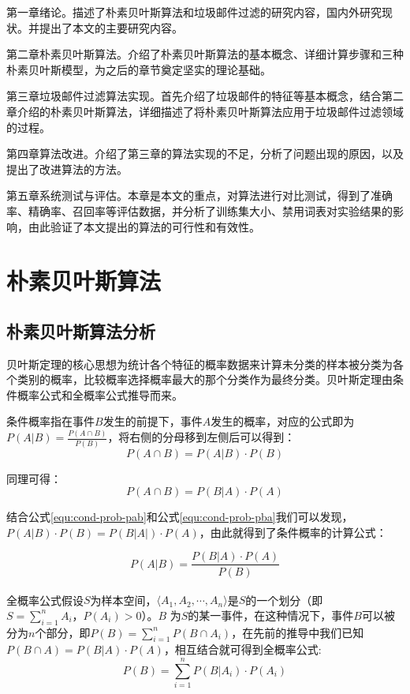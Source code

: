 \documentclass[UTF8,zihao=-4]{ctexart}
\newcommand{\upcite}[1]{\textsuperscript{\cite{#1}}}
\begin{document}
	第一章绪论。描述了朴素贝叶斯算法和垃圾邮件过滤的研究内容，国内外研究现状。并提出了本文的主要研究内容。
	
	第二章朴素贝叶斯算法。介绍了朴素贝叶斯算法的基本概念、详细计算步骤和三种朴素贝叶斯模型，为之后的章节奠定坚实的理论基础。
	
	第三章垃圾邮件过滤算法实现。首先介绍了垃圾邮件的特征等基本概念，结合第二章介绍的朴素贝叶斯算法，详细描述了将朴素贝叶斯算法应用于垃圾邮件过滤领域的过程。
	
	第四章算法改进。介绍了第三章的算法实现的不足，分析了问题出现的原因，以及提出了改进算法的方法。
	
	第五章系统测试与评估。本章是本文的重点，对算法进行对比测试，得到了准确率、精确率、召回率等评估数据，并分析了训练集大小、禁用词表对实验结果的影响，由此验证了本文提出的算法的可行性和有效性。

\newpage
\section{朴素贝叶斯算法}
\subsection{朴素贝叶斯算法分析}
	贝叶斯定理的核心思想为统计各个特征的概率数据来计算未分类的样本被分类为各个类别的概率，比较概率选择概率最大的那个分类作为最终分类。贝叶斯定理由条件概率公式和全概率公式推导而来。
	
	条件概率指在事件$B$发生的前提下，事件$A$发生的概率\cite{bayes}，对应的公式即为$P(A|B)=\frac{P(A\cap B)}{P(B)}$，将右侧的分母移到左侧后可以得到：
	\begin{equation}
	\label{equ:cond-prob-pab}
	P(A \cap B)=P(A|B) \cdot P(B)
	\end{equation}

	
	同理可得：
	\begin{equation}
	\label{equ:cond-prob-pba}
	P(A \cap B) = P(B|A) \cdot P(A)
	\end{equation}

	
	结合公式\ref{equ:cond-prob-pab}和公式\ref{equ:cond-prob-pba}我们可以发现，$P(A|B) \cdot P(B)=P(B|A|) \cdot P(A)$，由此就得到了条件概率的计算公式：
	
	\begin{equation}
	\label{equ:cond-prob}
	P(A|B)=\frac{P(B|A) \cdot P(A)}{P(B)}
	\end{equation}
	
	全概率公式\upcite{bayes}假设$S$为样本空间，$\langle A_1,A_2,\cdots,A_n \rangle$是$S$的一个划分（即$S=\sum\limits_{i=1}^{n}A_i \text{，} P(A_i)>0$）。$B$ 为$S$的某一事件，在这种情况下，事件$B$可以被分为$n$个部分，即$P(B)=\sum\limits_{i=1}^{n}P(B\cap A_i)$，在先前的推导中我们已知$P(B \cap A)=P(B|A) \cdot P(A)$，相互结合就可得到全概率公式:
	\begin{equation}
	\label{equ:full-prob}
	P(B)=\sum\limits_{i=1}^{n}P(B|A_i) \cdot P(A_i)
	\end{equation}
\end{document}
